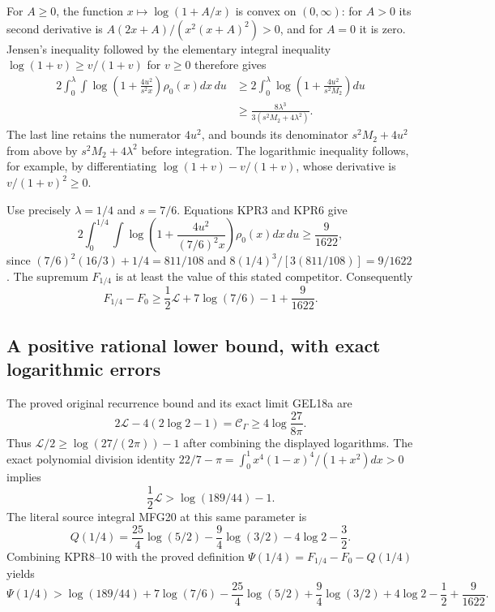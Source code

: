 \documentclass[11pt,a4paper]{article}
\begin{document}
For $A\geq0$, the function $x\mapsto\log(1+A/x)$ is convex
on $(0,\infty)$: for $A>0$ its second derivative is
$A(2x+A)/(x^2(x+A)^2)>0$, and for $A=0$ it is zero.
Jensen's inequality followed by the elementary integral inequality
$\log(1+v)\geq v/(1+v)$ for $v\geq0$ therefore gives
\[
 \begin{split}
 2\int_0^\lambda\int\log\left(1+\frac{4u^2}{s^2x}\right)
                      \rho_0(x)dx\,du
 &\geq2\int_0^\lambda\log\left(1+\frac{4u^2}{s^2M_2}\right)du\\
 &\geq\frac{8\lambda^3}{3(s^2M_2+4\lambda^2)}.
 \end{split}
 \tag{KPR6}
\]
The last line retains the numerator $4u^2$, and bounds its denominator
$s^2M_2+4u^2$ from above by $s^2M_2+4\lambda^2$ before integration.
The logarithmic inequality follows, for example, by differentiating
$\log(1+v)-v/(1+v)$, whose derivative is $v/(1+v)^2\geq0$.

Use precisely $\lambda=1/4$ and $s=7/6$. Equations KPR3 and KPR6 give
\[
 2\int_0^{1/4}\int\log\left(1+\frac{4u^2}{(7/6)^2x}\right)
                          \rho_0(x)dx\,du
 \geq\frac{9}{1622},
 \tag{KPR7}
\]
since $(7/6)^2(16/3)+1/4=811/108$ and
$8(1/4)^3/[3(811/108)]=9/1622$.
The supremum $F_{1/4}$ is at least the value of this stated competitor.
Consequently
\[
 F_{1/4}-F_0
 \geq\frac12\mathcal L+7\log(7/6)-1+\frac9{1622}.
 \tag{KPR8}
\]

\subsection{A positive rational lower bound, with exact logarithmic errors}
The proved original recurrence bound and its exact limit GEL18a are
\[
 2\mathcal L-4(2\log2-1)=\mathcal C_\Gamma
      \geq4\log\frac{27}{8\pi}.
\]
Thus
$\mathcal L/2\geq\log(27/(2\pi))-1$
after combining the displayed logarithms. The exact polynomial
division identity
$22/7-\pi=\int_0^1x^4(1-x)^4/(1+x^2)dx>0$ implies
\[
 \frac12\mathcal L>\log(189/44)-1.
 \tag{KPR9}
\]
The literal source integral MFG20 at this same parameter is
\[
 Q(1/4)=\frac{25}{4}\log(5/2)-\frac94\log(3/2)
                      -4\log2-\frac32.
 \tag{KPR10}
\]
Combining KPR8--10 with the proved definition
$\Psi(1/4)=F_{1/4}-F_0-Q(1/4)$ yields
\[
 \Psi(1/4)>
 \log(189/44)+7\log(7/6)-\frac{25}{4}\log(5/2)
       +\frac94\log(3/2)+4\log2-\frac12+\frac9{1622}.
 \tag{KPR11}
\]
\end{document}
